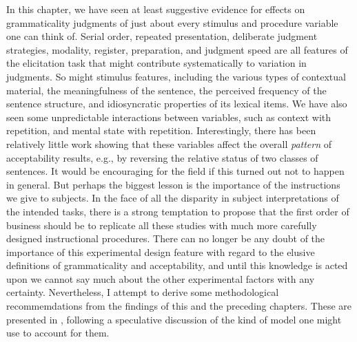 In this chapter, we have seen at least suggestive evidence for effects on grammaticality judgments of just about every stimulus and procedure variable one can think of. Serial order, repeated presentation, deliberate judgment strategies, modality, register, preparation, and judgment speed are all features of the elicitation task that might contribute systematically to variation in judgments. So might stimulus features, including the various types of contextual material, the meaningfulness of the sentence, the perceived frequency of the sentence structure, and idiosyncratic properties of its lexical items. We have also seen some  unpredictable interactions between variables, such as context with repetition, and mental state with repetition. Interestingly, there has been relatively little work showing that these variables affect the overall \textit{pattern} of acceptability results, e.g., by reversing the relative status of two classes of sentences. It would be encouraging for the field if this turned out not to happen in general. But perhaps  the biggest lesson is the importance of the instructions we give to subjects. In the face of all the disparity in subject interpretations of the intended tasks, there is a strong temptation to propose that the first order of business should be to replicate all these studies with much more carefully designed instructional procedures. There can no longer be any doubt of the importance of this experimental design feature with regard to the elusive definitions of grammaticality and acceptability, and until this knowledge is acted upon we cannot say much about the other experimental factors with any certainty. Nevertheless, I attempt to derive some methodological recommemdations from the findings of this and the preceding chapters. These are presented in , following a speculative discussion of the kind of model one might use to account for them.